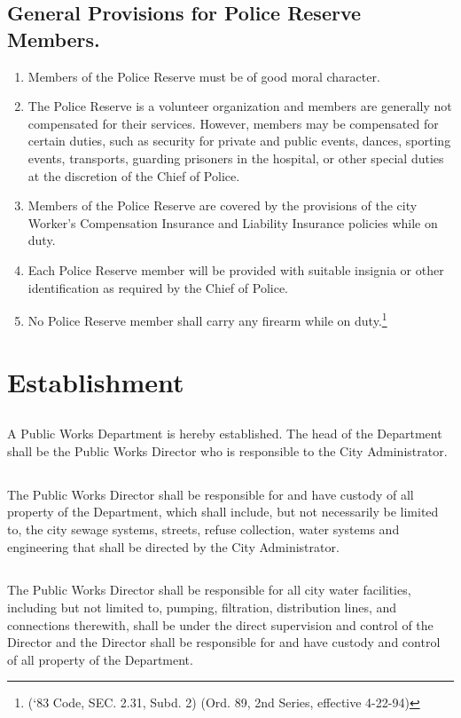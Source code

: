 \subsection{General Provisions for Police Reserve Members.}
\begin{enumerate}
    \item Members of the Police Reserve must be of good moral character.
    \item The Police Reserve is a volunteer organization and members are generally not compensated for their services. However, members may be compensated for certain duties, such as security for private and public events, dances, sporting events, transports, guarding prisoners in the hospital, or other special duties at the discretion of the Chief of Police.
    \item Members of the Police Reserve are covered by the provisions of the city Worker’s Compensation Insurance and Liability Insurance policies while on duty.
    \item Each Police Reserve member will be provided with suitable insignia or other identification as required by the Chief of Police.
    \item No Police Reserve member shall carry any firearm while on duty.\footnote{(‘83 Code, SEC. 2.31, Subd. 2)  (Ord. 89, 2nd Series, effective 4-22-94)}
\end{enumerate}


\setcounter{section}{79}
\section{Establishment}
\subsection{}
A Public Works Department is hereby established.  The head of the Department shall be the Public Works Director who is responsible to the City Administrator.
\subsection{}
The Public Works Director shall be responsible for and have custody of all property of the Department, which shall include, but not necessarily be limited to, the city sewage systems, streets, refuse collection, water systems and engineering that shall be directed by the City Administrator.
\subsection{}
The Public Works Director shall be responsible for all city water facilities, including but not limited to, pumping, filtration, distribution lines, and connections therewith, shall be under the direct supervision and control of the Director and the Director shall be responsible for and have custody and control of all property of the Department.
